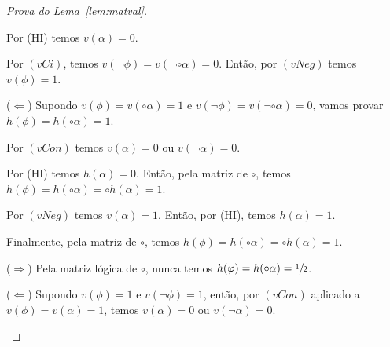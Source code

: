 \begin{proof}[Prova do Lema~\ref{lem:matval}]
\begin{provaporcasos}
\begin{provaporsubcasos}
\begin{provaporsubsubcasos}
                                
                                Por (HI) temos $v(\alpha) = 0$.
                            
                                Por $(vCi)$, temos $v(\neg \phi) = v(\neg \circ \alpha) = 0$. Então, por $(vNeg)$ temos $v(\phi) = 1$.

                                \setcounter{buffer}{\theSubSubCasos}
                        \end{provaporsubsubcasos}
                        
                        ($\Longleftarrow$) Supondo $v(\phi) = v(\circ \alpha) = 1$ e $v(\neg \phi) = v(\neg \circ \alpha) = 0$, vamos provar $h(\phi) = h(\circ \alpha) = 1$.
                        
                        Por $(vCon)$ temos $v(\alpha) = 0$ ou $v(\neg \alpha) = 0$.

                        \begin{provaporsubsubcasos}
                            \setcounter{SubSubCasos}{\thebuffer}


                                Por (HI) temos $h(\alpha) = 0$. Então, pela matriz de $\circ$, temos $h(\phi) = h(\circ \alpha) = \circ h(\alpha) = 1$.
                            

                                Por $(vNeg)$ temos $v(\alpha) = 1$. Então, por (HI), temos $h(\alpha) = 1$. 
                                
                                Finalmente, pela matriz de $\circ$, temos $h(\phi) = h(\circ \alpha) = \circ h(\alpha) = 1$.
                        \end{provaporsubsubcasos}
                        
                        
                        ($\Longrightarrow$) Pela matriz lógica de $\circ$, nunca temos $h(\varphi) = h(\circ \alpha) = \sfrac{1}{2}{}$.
                        
                        ($\Longleftarrow$) Supondo $v(\phi) = 1$ e $v(\neg \phi) = 1$, então, por $(vCon)$ aplicado a $v(\phi) = v(\alpha) = 1$, temos $v(\alpha) = 0$ ou $v(\neg \alpha) = 0$. 
                        

\end{provaporsubcasos}
\end{provaporcasos}
\end{proof}
